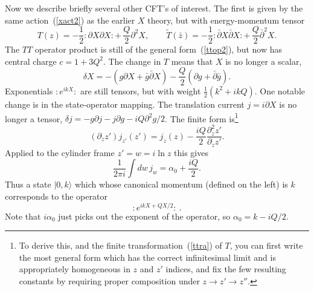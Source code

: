 Now we describe briefly several other CFT's of interest.  The
first is given by the same action~(\ref{xact2}) as the earlier $X$
theory, but with energy-momentum tensor~\cite{CT}
\begin{equation}
T(z) = -\frac{1}{2} :\! \partial X \partial X \! : +\,
\frac{Q}{2} \partial^2 X, \qquad
\tilde T(\bar z) = -\frac{1}{2} :\! \bar\partial X
\bar\partial X \! : +\, \frac{Q}{2} \bar\partial^2 X. \label{ldcft}
\end{equation}
The $TT$ operator product is still of the general
form~(\ref{ttop2}),
but now has central charge $c = 1 + 3 Q^2$. The change
in $T$ means that $X$ is no longer a scalar,
\begin{equation}
\delta X = -( g \partial X + \bar g \bar\partial X)
 - \frac{Q}{2} (\partial g + \bar\partial \bar g). \label{LDdelx}
\end{equation}
Exponentials $:\! e^{ikX} \! :$ are still tensors,
but with weight $\frac{1}{2} (k^2 + i k Q)$.  One notable change is
in the state-operator mapping.  The translation current
$j = i \partial X$ is no longer a tensor, $\delta j = - g \partial j
- j \partial g - iQ \partial^2 g /2$.  The finite form is\footnote
{To derive this, and the finite transformation~(\ref{ttra}) of $T$,
you can first write the most general form which has the correct
infinitesimal limit and is appropriately homogeneous in $z$ and $z'$
indices, and fix the few resulting constants by requiring proper
composition under $z \to z' \to z''$.}
\begin{equation}
(\partial_z z') j_{z'}(z') = j_z(z) - \frac{iQ}{2}
\frac{\partial^2_z z'}{\partial_z z'}.
\end{equation}
Applied to the cylinder frame $z' = w = i\ln z$ this gives
\begin{equation}
\frac{1}{2\pi i} \int dw\, j_w = \alpha_0 + \frac{iQ}{2}. \label{lmom}
\end{equation}
Thus a state $|0,k \rangle$ which whose canonical momentum (defined
on the left) is $k$ corresponds to the operator
\begin{equation}
:\! e^{ikX + QX/2} \! :\ . \label{lindvo}
\end{equation}
Note that $i\alpha_0$ just picks out the exponent of the
operator, so $\alpha_0 = k - i Q/2$. 

